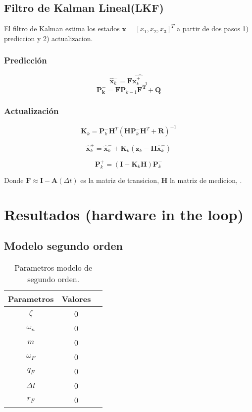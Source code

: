 \documentclass[conference]{IEEEtran}
\begin{document}
\subsection{Filtro de Kalman Lineal(LKF)}

El filtro de Kalman estima los estados $\textbf{x} = [x_1, x_2, x_3]^T$ a partir de dos pasos 1) prediccion y 2) actualizacion.



\subsubsection{Predicci\'on}


\[
\hat{\mathbf{x}}_k^- = \mathbf{F}\hat{\mathbf{x}^+_{k-1}}
\]
\[
\mathbf{P^-_k} = \mathbf{F} \mathbf{P}_{k-1} \mathbf{F^T} + \mathbf{Q}
\]

\subsubsection{Actualizaci\'on}

\[
\mathbf{K}_k = \mathbf{P}_k^- \mathbf{H}^T \left( \mathbf{H} \mathbf{P}_k^- \mathbf{H}^T + \mathbf{R} \right)^{-1}
\]

\[
\hat{\mathbf{x}}_k^+ = \hat{\mathbf{x}}_k^- + \mathbf{K}_k \left( \mathbf{z}_k - \mathbf{H} \hat{\mathbf{x}}_k^- \right)
\]

\[
\mathbf{P}_k^+ = \left( \mathbf{I} - \mathbf{K}_k \mathbf{H} \right) \mathbf{P}_k^-
\]

Donde $\mathbf{F}\approx \mathbf{I} - \mathbf{A}(\Delta t) $ es la matriz de transicion, $\mathbf{H}$  la matriz de medicion, .





\section{Resultados (hardware in the loop)}

\subsection{Modelo segundo orden}

\begin{table}[h]
	\centering
	\caption{Parametros modelo de segundo orden.}
	\label{tab:parametros_segundo_orden}
	\begin{tabular}{|c|c|c|}
		\hline
		\textbf{Parametros} & \textbf{Valores} \\
		\hline
		$\zeta$  &  0 \\
		$\omega_n$      & 0 \\
		$m$ & 0 \\
		$\omega_F$ & 0 \\
		$ q_F $  &  0\\
		$\Delta t$ & 0\\  
		$r_F$ & 0 \\ 
		\hline
	\end{tabular}
	
\end{table}
\end{document}

